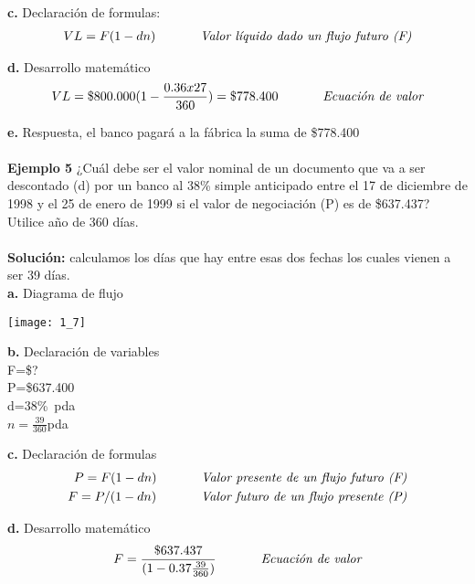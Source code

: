 \textbf{c.} Declaración de formulas:
\begin{align*}
VL= F(1-dn) \hspace{35 pt} \textit{Valor líquido dado un flujo futuro (F)}\\
\end{align*}

\textbf{d. }Desarrollo matemático
\begin{align*}
VL=\$800.000(1-\frac{0.36x27}{360})  = \$778.400 \hspace{35 pt} \textit{Ecuación de valor}
\end{align*}

\textbf{e.} Respuesta, el banco pagará a la fábrica la suma de \$778.400
\\\\
\textbf{Ejemplo 5}
¿Cuál debe ser el valor nominal de un documento que va a ser descontado (d) por un banco al 38\% simple anticipado entre el 17 de diciembre de 1998 y el 25 de enero de 1999 si el valor de negociación (P) es de \$637.437? Utilice año de 360 días.
\\\\
\textbf{Solución:}
calculamos los días que hay entre esas dos fechas los cuales vienen a ser 39 días.
\\
\textbf{a.} Diagrama de flujo
\begin{center}
\texttt{[image: 1\_7]}
\end{center}

\textbf{b. }Declaración de variables \\
F=\$?\\
P=\$637.400\\
d=38\%\ pda\\
$n=\frac{39}{360}$pda

\textbf{c.} Declaración de formulas
\begin{align*}
P=F(1-dn) \hspace{35 pt} \textit{Valor presente de un flujo futuro (F)}\\
F=P/(1-dn) \hspace{35 pt} \textit{Valor futuro de un flujo presente (P)}\\
\end{align*}

\textbf{d.} Desarrollo matemático
\begin{align*}
F=\frac{\$637.437}{(1-0.37  \frac{39}{360})} \hspace{35 pt} \textit{Ecuación de valor}
\end{align*}

